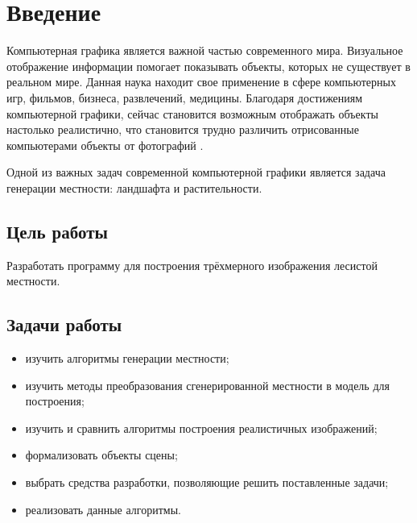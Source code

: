 
\chapter*{Введение}

Компьютерная графика является важной частью современного мира. Визуальное отображение информации помогает показывать объекты, которых не существует в реальном мире. Данная наука находит свое применение в сфере компьютерных игр, фильмов, бизнеса, развлечений, медицины.
Благодаря достижениям компьютерной графики, сейчас становится возможным отображать объекты настолько реалистично, что становится трудно различить отрисованные компьютерами объекты от фотографий \cite{bib:1}.

Одной из важных задач современной компьютерной графики является задача генерации местности: ландшафта и растительности. 

\section*{Цель работы}
Разработать программу для построения трёхмерного изображения лесистой местности.

\section*{Задачи работы}
\begin{itemize}
	\item изучить алгоритмы генерации местности;
	\item изучить методы преобразования сгенерированной местности в модель для построения;
	\item изучить и сравнить алгоритмы построения реалистичных изображений;
	\item формализовать объекты сцены;
	\item выбрать средства разработки, позволяющие решить поставленные задачи;
	\item реализовать данные алгоритмы.
\end{itemize}


\newpage